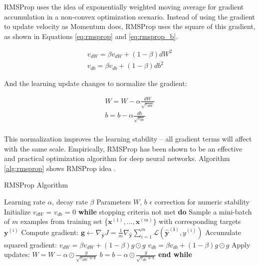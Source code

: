 RMSProp \cite{hinton2012} uses the idea of exponentially weighted moving average for gradient accumulation in a non-convex optimization scenario. Instead of using the gradient to update velocity as Momentum does, RMSProp uses the square of this gradient, as shown in Equations \ref{eq:rmsprop} and \ref{eq:rmsprop_b}.


\begin{align}\label{eq:rmsprop}
v_{dW} = \beta v_{dW} + (1 - \beta)dW^2\\
v_{db} = \beta v_{db} + (1 - \beta)db^2
\label{eq:rmsprop_b}
\end{align}

And the learning update changes to normalize the gradient:

\begin{align}\label{eq:rmspropupdate}
W = W - \alpha \frac{dW}{\sqrt{v_{dW}}}\\
b = b - \alpha \frac{db}{\sqrt{v_{db}}}\\
\label{eq:rmspropupdate_b}
\end{align}

This normalization improves the learning stability -- all gradient terms will affect with the same scale. Empirically, RMSProp has been shown to be an effective and practical optimization algorithm for deep neural networks. Algorithm \ref{alg:rmsprop} shows RMSProp idea \cite{Goodfellow-et-al-2016}.


\begin{algorithm}[!htbp]
	\caption{RMSProp Algorithm}
	\begin{algorithmic}
		\REQUIRE Learning rate $\alpha$, decay rate $\beta$
		\REQUIRE Parameters $W$, $b$
		\REQUIRE $\epsilon$ correction for numeric stability 
		\STATE Initialize $v_{dW}$ = $v_{db}$ = 0
		\STATE \textbf{while} stopping criteria not met \textbf{do}
		\STATE \hspace{5mm} Sample a mini-batch of $m$ examples from training set \{$\boldsymbol{x}^{(1)}, \dots, \boldsymbol{x}^{(m)} \}$ with corresponding targets $\boldsymbol{y}^{(i)}$
		\STATE \hspace{5mm} Compute gradient: 
		 $\boldsymbol{g} \leftarrow \nabla_{\boldsymbol{\hat{y}}}J = \frac{1}{m} \nabla_{\boldsymbol{\hat{y}}}\sum_{i = 1}^{m}\mathcal{L}(\boldsymbol{\hat{y}^{(i)}},y^{(i)})$
		 \STATE \hspace{5mm} Accumulate squared gradient: \STATE \hspace{10mm} $v_{dW} = \beta v_{dW} + (1-\beta) g \odot g$ 
		 \STATE \hspace{10mm} $v_{db} = \beta v_{db} + (1-\beta) g \odot g$
		 \STATE \hspace{5mm} Apply updates:
		 \STATE \hspace{10mm} $W = W - \alpha \odot \frac{g}{\sqrt{v_{dW} + \epsilon}}$ 
		 \STATE \hspace{10mm} $b = b - \alpha \odot \frac{g}{\sqrt{v_{db} + \epsilon}}$ 
		\STATE \textbf{end while}
	\end{algorithmic}
	\label{alg:rmsprop}
\end{algorithm}

